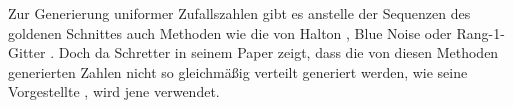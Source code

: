 Zur Generierung uniformer Zufallszahlen gibt es anstelle der Sequenzen des goldenen Schnittes auch Methoden wie
die von Halton \cite{wong_luk_heng-halton_points_sampling-1997}, Blue Noise \cite{yan-blue_noise_sampling-2015} oder Rang-1-Gitter 
\cite{prasad-rank1lattice-1973}. Doch da Schretter in seinem Paper zeigt, dass die von diesen Methoden generierten Zahlen 
nicht so gleichmäßig verteilt generiert werden, wie seine Vorgestellte \cite{schretter-golden_ratio_sequences-2012}, 
wird jene verwendet. 